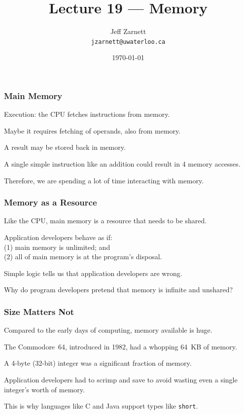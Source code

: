 

\title{Lecture 19 --- Memory }

\author{Jeff Zarnett \\ \small \texttt{jzarnett@uwaterloo.ca}}
\date{\today}




\begin{frame}
  \titlepage

 \end{frame}


\begin{frame}
\frametitle{Main Memory}

Execution: the CPU fetches instructions from memory.

Maybe it requires fetching of operands, also from memory. 

A result may be stored back in memory. 

A single simple instruction like an addition could result in 4 memory accesses. 

Therefore, we are spending a lot of time interacting with memory.


\end{frame}

\begin{frame}
\frametitle{Memory as a Resource}


Like the CPU, main memory is a resource that needs to be shared. 

Application developers behave as if:\\
\quad (1) main memory is unlimited; and \\
\quad (2) all of main memory is at the program's disposal. 

Simple logic tells us that application developers are wrong. 

Why do program developers pretend that memory is infinite and unshared?

\end{frame}

\begin{frame}
\frametitle{Size Matters Not}

Compared to the early days of computing, memory available is huge. 

The Commodore~64, introduced in 1982, had a whopping 64~KB of memory. 

A 4-byte (32-bit) integer was a significant fraction of memory. 

Application developers had to scrimp and save to avoid wasting even a single integer's worth of memory. 

This is why languages like C and Java support types like \texttt{short}.

\end{frame}

